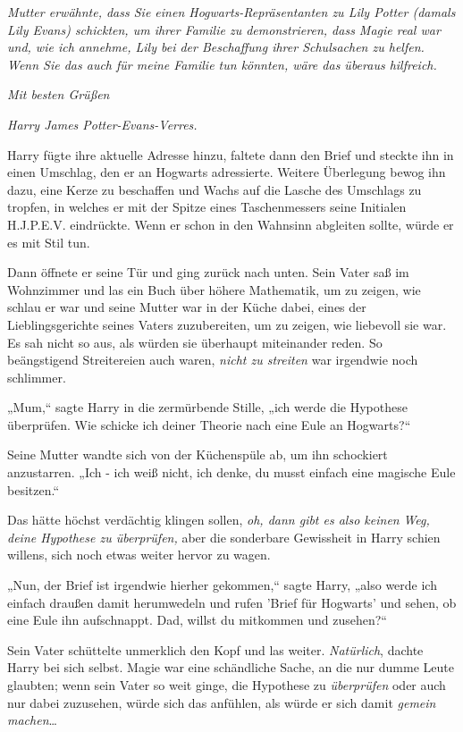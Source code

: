 {\emph{Mutter erwähnte, dass Sie einen Hogwarts-Repräsentanten zu Lily Potter (damals Lily Evans) schickten, um ihrer Familie zu demonstrieren, dass Magie real war und, wie ich annehme, Lily bei der Beschaffung ihrer Schulsachen zu helfen. Wenn Sie das auch für meine Familie tun könnten, wäre das überaus hilfreich.}

\emph{Mit besten Grüßen}

\emph{Harry James Potter-Evans-Verres.}

Harry fügte ihre aktuelle Adresse hinzu, faltete dann den Brief und steckte ihn in einen Umschlag, den er an Hogwarts adressierte. Weitere Überlegung bewog ihn dazu, eine Kerze zu beschaffen und Wachs auf die Lasche des Umschlags zu tropfen, in welches er mit der Spitze eines Taschenmessers seine Initialen H.J.P.E.V. eindrückte. Wenn er schon in den Wahnsinn abgleiten sollte, würde er es mit Stil tun.

Dann öffnete er seine Tür und ging zurück nach unten. Sein Vater saß im Wohnzimmer und las ein Buch über höhere Mathematik, um zu zeigen, wie schlau er war und seine Mutter war in der Küche dabei, eines der Lieblingsgerichte seines Vaters zuzubereiten, um zu zeigen, wie liebevoll sie war. Es sah nicht so aus, als würden sie überhaupt miteinander reden. So beängstigend Streitereien auch waren, \emph{nicht zu streiten} war irgendwie noch schlimmer.

„Mum,“ sagte Harry in die zermürbende Stille, „ich werde die Hypothese überprüfen. Wie schicke ich deiner Theorie nach eine Eule an Hogwarts?“

Seine Mutter wandte sich von der Küchenspüle ab, um ihn schockiert anzustarren. „Ich - ich weiß nicht, ich denke, du musst einfach eine magische Eule besitzen.“

Das hätte höchst verdächtig klingen sollen, \emph{oh, dann gibt es also keinen} \emph{Weg, deine Hypothese zu überprüfen,} aber die sonderbare Gewissheit in Harry schien willens, sich noch etwas weiter hervor zu wagen.

„Nun, der Brief ist irgendwie hierher gekommen,“ sagte Harry, „also werde ich einfach draußen damit herumwedeln und rufen 'Brief für Hogwarts' und sehen, ob eine Eule ihn aufschnappt. Dad, willst du mitkommen und zusehen?“

Sein Vater schüttelte unmerklich den Kopf und las weiter. \emph{Natürlich}, dachte Harry bei sich selbst. Magie war eine schändliche Sache, an die nur dumme Leute glaubten; wenn sein Vater so weit ginge, die Hypothese zu \emph{überprüfen} oder auch nur dabei zuzusehen, würde sich das anfühlen, als würde er sich damit \emph{gemein machen}…

}
